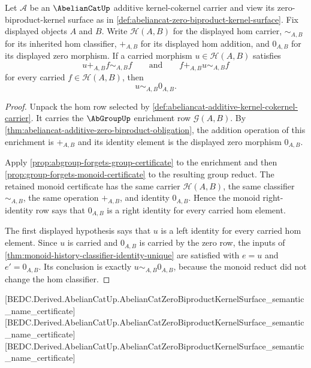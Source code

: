 \begin{theorem}
\label{thm:abeliancat-hom-zero-morphism-uniqueness}
Let $\mathcal A$ be an $\AbelianCatUp$ additive kernel-cokernel carrier and
view its zero-biproduct-kernel surface as in
\autoref{def:abeliancat-zero-biproduct-kernel-surface}. Fix displayed objects
$A$ and $B$. Write $\mathcal H(A,B)$ for the displayed hom carrier,
$\sim_{A,B}$ for its inherited hom classifier, $+_{A,B}$ for its displayed hom
addition, and $0_{A,B}$ for its displayed zero morphism. If a carried morphism
$u\in\mathcal H(A,B)$ satisfies
$$
u+_{A,B}f\sim_{A,B}f
\qquad\text{and}\qquad
f+_{A,B}u\sim_{A,B}f
$$
for every carried $f\in\mathcal H(A,B)$, then
$$
u\sim_{A,B}0_{A,B}.
$$
\end{theorem}
\begin{proof}
Unpack the hom row selected by
\autoref{def:abeliancat-additive-kernel-cokernel-carrier}. It carries the
$\AbGroupUp$ enrichment row $\mathcal G(A,B)$. By
\autoref{thm:abeliancat-additive-zero-biproduct-obligation}, the addition
operation of this enrichment is $+_{A,B}$ and its identity element is the
displayed zero morphism $0_{A,B}$.

Apply \autoref{prop:abgroup-forgets-group-certificate} to the enrichment and
then \autoref{prop:group-forgets-monoid-certificate} to the resulting group
reduct. The retained monoid certificate has the same carrier
$\mathcal H(A,B)$, the same classifier $\sim_{A,B}$, the same operation
$+_{A,B}$, and identity $0_{A,B}$. Hence the monoid right-identity row says
that $0_{A,B}$ is a right identity for every carried hom element.

The first displayed hypothesis says that $u$ is a left identity for every
carried hom element. Since $u$ is carried and $0_{A,B}$ is carried by the zero
row, the inputs of \autoref{thm:monoid-history-classifier-identity-unique} are
satisfied with $e=u$ and $e'=0_{A,B}$. Its conclusion is exactly
$u\sim_{A,B}0_{A,B}$, because the monoid reduct did not change the hom
classifier.
\end{proof}

[BEDC.Derived.AbelianCatUp.AbelianCatZeroBiproductKernelSurface\_semantic\_name\_certificate]
[BEDC.Derived.AbelianCatUp.AbelianCatZeroBiproductKernelSurface\_semantic\_name\_certificate]
[BEDC.Derived.AbelianCatUp.AbelianCatZeroBiproductKernelSurface\_semantic\_name\_certificate]

